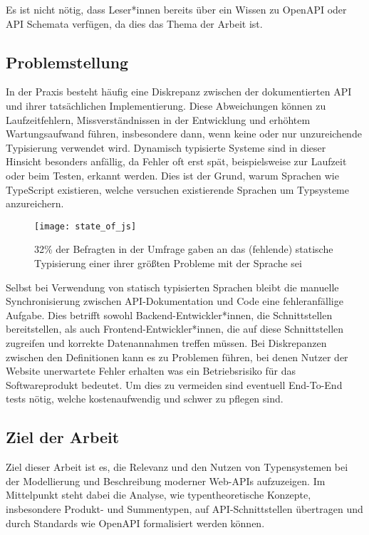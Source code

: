 Es ist nicht nötig, dass Leser*innen bereits über ein Wissen zu OpenAPI oder API Schemata verfügen, da dies das Thema der Arbeit ist.

\subsection{Problemstellung}

In der Praxis besteht häufig eine Diskrepanz zwischen der dokumentierten API und ihrer tatsächlichen Implementierung.
Diese Abweichungen können zu Laufzeitfehlern, Missverständnissen in der Entwicklung und erhöhtem Wartungsaufwand führen, insbesondere dann, wenn keine oder nur unzureichende Typisierung verwendet wird. 
Dynamisch typisierte Systeme sind in dieser Hinsicht besonders anfällig, da Fehler oft erst spät, beispielsweise zur Laufzeit oder beim Testen, erkannt werden.
Dies ist der Grund, warum Sprachen wie TypeScript existieren, welche versuchen existierende Sprachen um Typsysteme anzureichern.

\begin{figure}[H]
  \centering
  \texttt{[image: state\_of\_js]}
  \caption{32\% der Befragten in der  Umfrage gaben an das (fehlende) statische Typisierung einer ihrer größten Probleme mit der Sprache sei \cite{Greif_Burel_2024}}
\end{figure}

Selbst bei Verwendung von statisch typisierten Sprachen bleibt die manuelle Synchronisierung zwischen API-Dokumentation und Code eine fehleranfällige Aufgabe. 
Dies betrifft sowohl Backend-Entwickler*innen, die Schnittstellen bereitstellen, als auch Frontend-Entwickler*innen, 
die auf diese Schnittstellen zugreifen und korrekte Datenannahmen treffen müssen.
Bei Diskrepanzen zwischen den Definitionen kann es zu Problemen führen, bei denen Nutzer der Website unerwartete Fehler erhalten was ein Betriebsrisiko für
das Softwareprodukt bedeutet. Um dies zu vermeiden sind eventuell End-To-End tests nötig, welche kostenaufwendig und schwer zu pflegen sind.

\subsection{Ziel der Arbeit}

Ziel dieser Arbeit ist es, die Relevanz und den Nutzen von Typensystemen bei der Modellierung und Beschreibung moderner Web-APIs aufzuzeigen. 
Im Mittelpunkt steht dabei die Analyse, wie typentheoretische Konzepte, insbesondere Produkt- und Summentypen, auf API-Schnittstellen übertragen 
und durch Standards wie OpenAPI formalisiert werden können.

